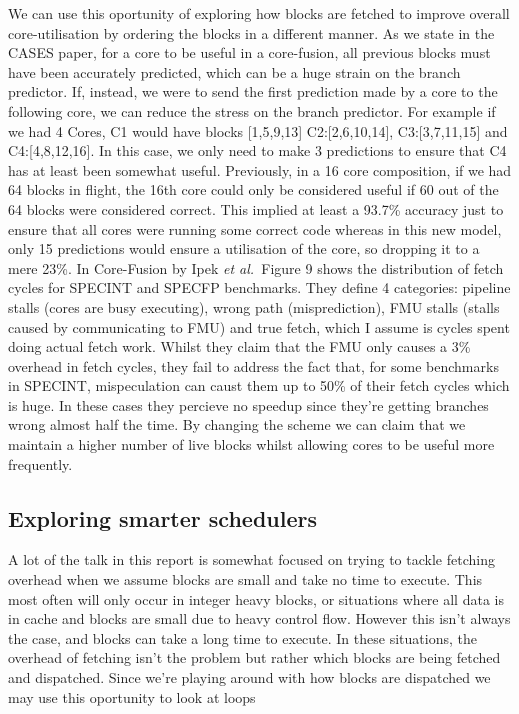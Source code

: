 We can use this oportunity of exploring how blocks are fetched to improve overall core-utilisation by ordering the blocks in a different manner.
As we state in the CASES paper, for a core to be useful in a core-fusion, all previous blocks must have been accurately predicted, which can be a huge strain on the branch predictor.
If, instead, we were to send the first prediction made by a core to the following core, we can reduce the stress on the branch predictor.
For example if we had 4 Cores, C1 would have blocks [1,5,9,13] C2:[2,6,10,14], C3:[3,7,11,15] and C4:[4,8,12,16].
In this case, we only need to make 3 predictions to ensure that C4 has at least been somewhat useful.
Previously, in a 16 core composition, if we had 64 blocks in flight, the 16th core could only be considered useful if 60 out of the 64 blocks were considered correct.
This implied at least a 93.7\% accuracy just to ensure that all cores were running some correct code whereas in this new model, only 15 predictions would ensure a utilisation of the core, so dropping it to a mere 23\%.
In Core-Fusion by Ipek {\it et al.~}Figure 9 shows the distribution of fetch cycles for SPECINT and SPECFP benchmarks.
They define 4 categories: pipeline stalls (cores are busy executing), wrong path (misprediction), FMU stalls (stalls caused by communicating to FMU) and true fetch, which I assume is cycles spent doing actual fetch work.
Whilst they claim that the FMU only causes a 3\% overhead in fetch cycles, they fail to address the fact that, for some benchmarks in SPECINT, mispeculation can caust them up to 50\% of their fetch cycles which is huge.
In these cases they percieve no speedup since they're getting branches wrong almost half the time.
By changing the scheme we can claim that we maintain a higher number of live blocks whilst allowing cores to be useful more frequently.

\subsection{Exploring smarter schedulers}

A lot of the talk in this report is somewhat focused on trying to tackle fetching overhead when we assume blocks are small and take no time to execute.
This most often will only occur in integer heavy blocks, or situations where all data is in cache and blocks are small due to heavy control flow.
However this isn't always the case, and blocks can take a long time to execute.
In these situations, the overhead of fetching isn't the problem but rather which blocks are being fetched and dispatched.
Since we're playing around with how blocks are dispatched we may use this oportunity to look at loops 
